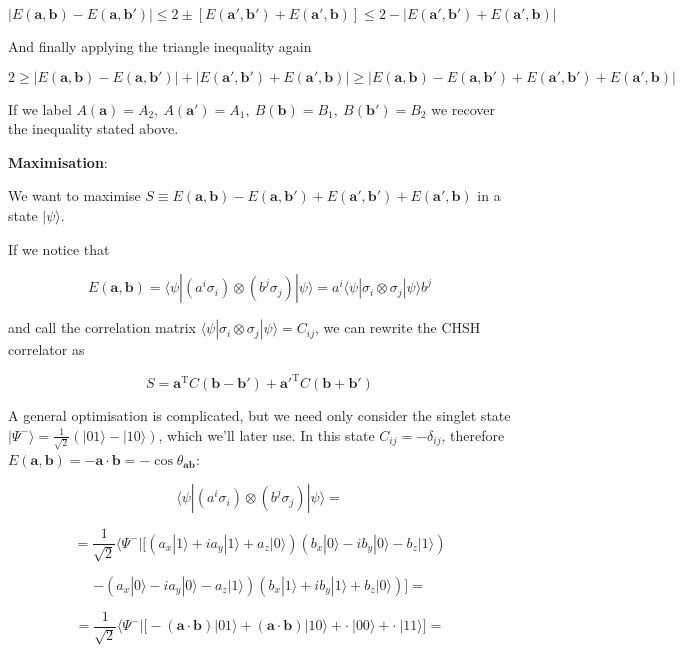 \documentclass[11pt,dvipsnames]{article}
\begin{document}
$$
|E(\mathbf{a}, \mathbf{b}) - E(\mathbf{a}, \mathbf{b'})| \leq 
2 \pm [E(\mathbf{a'}, \mathbf{b'}) + E(\mathbf{a'}, \mathbf{b})] \leq
2 -   |E(\mathbf{a'}, \mathbf{b'}) + E(\mathbf{a'}, \mathbf{b})|
$$

And finally applying the triangle inequality again

$$
2 \geq |E(\mathbf{a}, \mathbf{b}) - E(\mathbf{a}, \mathbf{b'})| + 
|E(\mathbf{a'}, \mathbf{b'}) + E(\mathbf{a'}, \mathbf{b})| \geq
|E(\mathbf{a}, \mathbf{b}) -   E(\mathbf{a}, \mathbf{b'}) +
E(\mathbf{a'}, \mathbf{b'}) +  E(\mathbf{a'}, \mathbf{b})|
$$

If we label $A(\mathbf{a})=A_2,\ A(\mathbf{a'})=A_1,\ B(\mathbf{b})=B_1,\ B(\mathbf{b'})=B_2$ we recover the inequality stated above.

\textbf{Maximisation}:

We want to maximise $S \equiv E(\mathbf{a}, \mathbf{b}) - E(\mathbf{a}, \mathbf{b'}) +
E(\mathbf{a'}, \mathbf{b'}) + E(\mathbf{a'}, \mathbf{b})$ in a state $|\psi\rangle$.

If we notice that 

$$
E(\mathbf{a}, \mathbf{b}) = \langle\psi|(a^i\sigma_i)\otimes(b^j\sigma_j)|\psi\rangle = 
a^i\langle\psi|\sigma_i\otimes\sigma_j|\psi\rangle b^j
$$

and call the correlation matrix $\langle\psi|\sigma_i\otimes\sigma_j|\psi\rangle = C_{ij}$, we can rewrite the CHSH correlator as

$$
S = \mathbf{a}^\mathrm{T} C (\mathbf{b}-\mathbf{b'})+\mathbf{a'}^\mathrm{T} C (\mathbf{b}+\mathbf{b'})
$$

A general optimisation is complicated, but we need only consider the singlet state $|\Psi^-\rangle=\tfrac{1}{\sqrt{2}}(|01\rangle-|10\rangle)$, which we'll later use. In this state $C_{ij}=-\delta_{ij}$, therefore $E(\mathbf{a}, \mathbf{b})=-\mathbf{a}\cdot\mathbf{b}=-\cos\theta_{\mathbf{a}\mathbf{b}}$:


$$
\langle\psi|(a^i\sigma_i)\otimes(b^j\sigma_j)|\psi\rangle = 
$$

$$
= \frac{1}{\sqrt{2}}\langle\Psi^-| 
\bigg[(a_x|1\rangle+ia_y|1\rangle+a_z|0\rangle)(b_x|0\rangle-ib_y|0\rangle-b_z|1\rangle)
$$

$$
- (a_x|0\rangle-ia_y|0\rangle-a_z|1\rangle)(b_x|1\rangle+ib_y|1\rangle+b_z|0\rangle)\bigg] = 
$$

$$
=  \frac{1}{\sqrt{2}}\langle\Psi^-| 
\bigg[-(\mathbf{a}\cdot\mathbf{b})|01\rangle+(\mathbf{a}\cdot\mathbf{b})|10\rangle+ \cdot\ |00\rangle+\cdot\ |11\rangle\bigg] = 
$$
\end{document}
